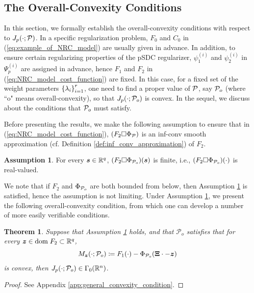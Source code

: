 \documentclass[lettersize,journal]{IEEEtran}
\theoremstyle{plain}%
\newtheorem{theorem}{Theorem}
\theoremstyle{definition}
\newtheorem{assumption}{Assumption}
\theoremstyle{remark}
\begin{document}
\subsection{The Overall-Convexity Conditions}
In this section, we formally establish the overall-convexity conditions with respect to $J_{p}(\cdot;\mathcal{P})$. In a specific regularization problem, $F_0$ and $C_0$ in (\ref{eq:example_of_NRC_model}) are usually given in advance. In addition, to ensure certain regularizing properties of the pSDC regularizer, $\psi_{1}^{(i)}$ and $\psi_{2}^{(i)}$ in $\Psi_{p}^{(i)}$ are assigned in advance, hence $F_1$ and $F_2$ in (\ref{eq:NRC_model_cost_function}) are fixed. In this case, for a fixed set of the weight parameters $\left\{ \lambda_i \right\}_{i=1}^r$, one need to find a proper value of $\mathcal{P}$, say $\mathcal{P}_o$ (where ``o" means overall-convexity), so that $J_{p}(\cdot;\mathcal{P}_o)$ is convex. In the sequel, we discuss about the conditions that $
\mathcal{P}_o$ must satisfy.

Before presenting the results, we make the following assumption to ensure that in (\ref{eq:NRC_model_cost_function}), $(F_2\Box\Phi_{\mathcal{P}})$ is an inf-conv smooth approximation (cf. Definition \ref{def:inf_conv_approximation}) of $F_2$.

\begin{assumption}\label{assump:finite_inf_conv}
For every $\bm{s}\in\mathbb{R}^q$, $(F_2\Box\Phi_{\mathcal{P}_o})(\bm{s})$ is finite, i.e., $(F_2\Box\Phi_{\mathcal{P}_o})(\cdot)$ is real-valued.
\end{assumption}

We note that if $F_2$ and $\Phi_{\mathcal{P}_o}$ are both bounded from below, then Assumption \ref{assump:finite_inf_conv} is satisfied, hence the assumption is not limiting. Under Assumption \ref{assump:finite_inf_conv}, we present the following overall-convexity condition, from which one can develop a number of more easily verifiable conditions.
\begin{theorem}\label{thm:general_convexity_condition}
Suppose that Assumption \ref{assump:finite_inf_conv} holds, and that $\mathcal{P}_o$ satisfies that for every $\bm{z}\in\mathrm{dom}\;{F_2}\subset\mathbb{R}^q$,
\begin{equation}\label{eq:general_convexity_condition}
M_{\bm{z}}(\cdot;\mathcal{P}_o)\coloneqq F_1(\cdot)-\Phi_{\mathcal{P}_o}(\bm{\Xi}\cdot-\bm{z})
\end{equation}
is convex, then $J_{p}(\cdot;\mathcal{P}_o)\in\Gamma_0(\mathbb{R}^n)$.
\end{theorem}
\begin{proof}
See Appendix \ref{app:general_convexity_condition}.
\end{proof}
\end{document}

